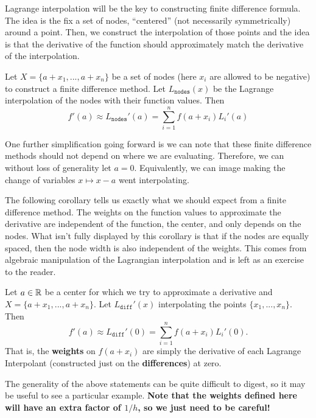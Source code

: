 \documentclass[11pt]{article}
\begin{document}
Lagrange interpolation will be the key to constructing finite difference formula. The idea is the fix a set of nodes, ``centered'' (not necessarily symmetrically) around a point. Then, we construct the interpolation of those points and the idea is that the derivative of the function should approximately match the derivative of the interpolation.

\begin{theorem}
    Let $X= \{a+x_1, ..., a+x_n\}$ be a set of nodes (here $x_i$ are allowed to be negative) to construct a finite difference method. Let $L_\mathtt{nodes}(x)$ be the Lagrange interpolation of the nodes with their function values. Then $$f'(a) \approx L_\mathtt{nodes}'(a) = \sum_{i=1}^n f(a+x_i)L_i'(a)$$   
\end{theorem}

\begin{remark}
    One further simplification going forward is we can note that these finite difference methods should not depend on where we are evaluating. Therefore, we can without loss of generality let $a = 0$. Equivalently, we can image making the change of variables $x \mapsto x-a$ went interpolating.  
\end{remark}

The following corollary tells us exactly what we should expect from a finite difference method. The weights on the function values to approximate the derivative are independent of the function, the center, and only depends on the nodes. What isn't fully displayed by this corollary is that if the nodes are equally spaced, then the node width is also independent of the weights. This comes from algebraic manipulation of the Lagrangian interpolation and is left as an exercise to the reader. 


\begin{corollary}
    Let $a \in \mathbb{R}$ be a center for which we try to approximate a derivative and $X = \{a+x_1, ..., a+x_n\}$. Let $L_\mathtt{diff}'(x)$ interpolating the points $\{x_1, ..., x_n\}$. Then $$f'(a) \approx L_{\mathtt{diff}}'(0) = \sum_{i=1}^n f(a+x_i) L_i'(0).$$
    That is, the \textbf{weights} on $f(a+x_i)$ are simply the derivative of each Lagrange Interpolant (constructed just on the \textbf{differences}) at zero. 
\end{corollary}


The generality of the above statements can be quite difficult to digest, so it may be useful to see a particular example. \textbf{Note that the weights defined here will have an extra factor of $1/h$, so we just need to be careful!}
\end{document}

